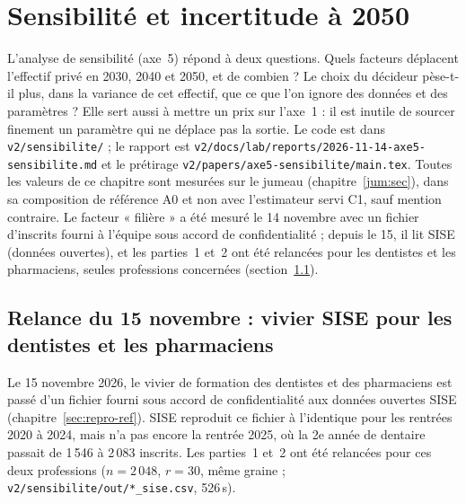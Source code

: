 \begingroup\sloppy\setlength{\emergencystretch}{3em}%

\section{Sensibilité et incertitude à 2050}\label{sec:sensibilite-ref}\label{sen:sec}

L'analyse de sensibilité (axe~5) répond à deux questions. Quels facteurs déplacent l'effectif privé en 2030, 2040
et 2050, et de combien ? Le choix du décideur pèse-t-il plus, dans la variance de cet effectif, que ce que l'on
ignore des données et des paramètres ? Elle sert aussi à mettre un prix sur l'axe~1 : il est inutile de sourcer
finement un paramètre qui ne déplace pas la sortie. Le code est dans \texttt{v2/sensibilite/} ; le rapport est
\texttt{v2/docs/lab/reports/2026-11-14-axe5-sensibilite.md} et le prétirage \texttt{v2/papers/axe5-sensibilite/main.tex}.
Toutes les valeurs de ce chapitre sont mesurées sur le jumeau (chapitre~\ref{jum:sec}), dans sa composition de
référence A0 et non avec l'estimateur servi C1, sauf mention contraire. Le facteur « filière » a été mesuré le 14 novembre avec
un fichier d'inscrits fourni à l'équipe sous accord de confidentialité ; depuis le 15, il lit SISE (données
ouvertes), et les parties~1 et~2 ont été relancées pour les dentistes et les pharmaciens, seules professions
concernées (section~\ref{sen:sise}).

\subsection{Relance du 15 novembre : vivier SISE pour les dentistes et les pharmaciens}\label{sen:sise}
Le 15 novembre 2026, le vivier de formation des dentistes et des pharmaciens est passé d'un fichier fourni sous
accord de confidentialité aux données ouvertes SISE (chapitre~\ref{sec:repro-ref}). SISE reproduit ce fichier à
l'identique pour les rentrées 2020 à 2024\mesure, mais n'a pas encore la rentrée 2025, où la 2e année de dentaire
passait de 1\,546 à 2\,083 inscrits\mesure. Les parties~1 et~2 ont été relancées pour ces deux professions
($n = 2\,048$, $r = 30$, même graine ; \texttt{v2/sensibilite/out/*\_sise.csv}, 526\,s\mesure).

